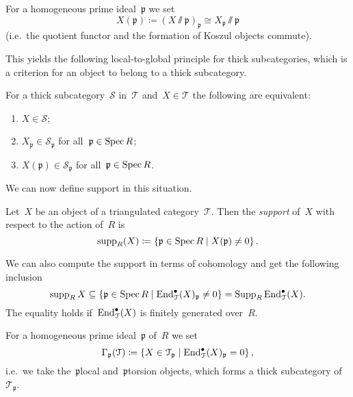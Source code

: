 \documentclass[10pt,a4paper]{article}
\begin{document}
\begin{definition}
  For a homogeneous prime ideal~$\mathfrak{p}$ we set
  \begin{equation}
    X(\mathfrak{p})\coloneqq(X\sslash\mathfrak{p})_{\mathfrak{p}}\cong X_{\mathfrak{p}}\sslash\mathfrak{p}
  \end{equation}
  (i.e.\ the quotient functor and the formation of Koszul objects commute).
\end{definition}
This yields the following local-to-global principle for thick subcategories, which is a criterion for an object to belong to a thick subcategory.
\begin{theorem}
  For a thick subcategory~$\mathcal{S}$ in~$\mathcal{T}$ and~$X\in\mathcal{T}$ the following are equivalent:
  \begin{enumerate}
    \item $X\in\mathcal{S}$;
    \item $X_{\mathfrak{p}}\in\mathcal{S}_{\mathfrak{p}}$ for all~$\mathfrak{p}\in\operatorname{Spec} R$;
    \item $X(\mathfrak{p})\in\mathcal{S}_{\mathfrak{p}}$ for all~$\mathfrak{p}\in\operatorname{Spec} R$.
  \end{enumerate}
\end{theorem}
We can now define support in this situation.
\begin{definition}
  Let~$X$ be an object of a triangulated category~$\mathcal{T}$. Then the \emph{support} of~$X$ with respect to the action of~$R$ is
  \begin{equation}
    \operatorname{supp}_R(X)\coloneqq\left\{ \mathfrak{p}\in\operatorname{Spec} R\mid X(\mathfrak{p})\neq 0 \right\}.
  \end{equation}
\end{definition}
\begin{remark}
  We can also compute the support in terms of cohomology and get the following inclusion
  \begin{equation}
    \operatorname{supp}_R X\subseteq\left\{ \mathfrak{p}\in\operatorname{Spec} R\mid\operatorname{End}_{\mathcal{T}}^\bullet(X)_{\mathfrak{p}}\neq 0 \right\}=\operatorname{Supp}_R\operatorname{End}_{\mathcal{T}}^\bullet(X).
  \end{equation}
  The equality holds if~$\operatorname{End}_{\mathcal{T}}^\bullet(X)$ is finitely generated over~$R$.
\end{remark}

For a homogeneous prime ideal~$\mathfrak{p}$ of~$R$ we set
\begin{equation}
  \Gamma_{\mathfrak{p}}(\mathcal{T})\coloneqq\left\{ X\in\mathcal{T}_{\mathfrak{p}}\mid\operatorname{End}_{\mathcal{T}}^\bullet(X)_{\mathfrak{p}}=0 \right\},
\end{equation}
i.e.\ we take the~$\mathfrak{p}$\dash local and~$\mathfrak{p}$\dash torsion objects, which forms a thick subcategory of~$\mathcal{T}_{\mathfrak{p}}$.
\end{document}
